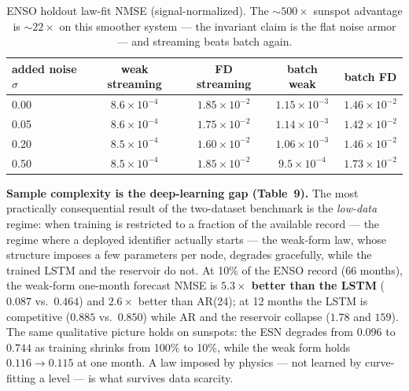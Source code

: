 \documentclass[10pt]{article}
\begin{document}
\begin{table}[h]
\centering\footnotesize
\caption{ENSO holdout law-fit NMSE (signal-normalized). The ${\sim}500\times$
sunspot advantage is ${\sim}22\times$ on this smoother system --- the invariant
claim is the flat noise armor --- and streaming beats batch again.}
\begin{tabular}{lcccc}
\toprule
added noise $\sigma$ & weak streaming & FD streaming & batch weak & batch FD \\
\midrule
0.00 & $8.6{\times}10^{-4}$ & $1.85{\times}10^{-2}$ & $1.15{\times}10^{-3}$ & $1.46{\times}10^{-2}$ \\
0.05 & $8.6{\times}10^{-4}$ & $1.75{\times}10^{-2}$ & $1.14{\times}10^{-3}$ & $1.42{\times}10^{-2}$ \\
0.20 & $8.5{\times}10^{-4}$ & $1.60{\times}10^{-2}$ & $1.06{\times}10^{-3}$ & $1.46{\times}10^{-2}$ \\
0.50 & $8.5{\times}10^{-4}$ & $1.85{\times}10^{-2}$ & $9.5{\times}10^{-4}$ & $1.73{\times}10^{-2}$ \\
\bottomrule
\end{tabular}
\end{table}

\textbf{Sample complexity is the deep-learning gap (Table~9).} The most
practically consequential result of the two-dataset benchmark is the
\emph{low-data} regime: when training is restricted to a fraction of the
available record --- the regime where a deployed identifier actually starts ---
the weak-form law, whose structure imposes a few parameters per node, degrades
gracefully, while the trained LSTM and the reservoir do not. At 10\% of the
ENSO record (66 months), the weak-form one-month forecast NMSE is
\textbf{$5.3\times$ better than the LSTM} ($0.087$ vs.\ $0.464$) and
$2.6\times$ better than AR(24); at 12 months the LSTM is competitive
($0.885$ vs.\ $0.850$) while AR and the reservoir collapse ($1.78$ and
$159$). The same qualitative picture holds on sunspots: the ESN degrades from
$0.096$ to $0.744$ as training shrinks from 100\% to 10\%, while the weak form
holds $0.116 \to 0.115$ at one month. A law imposed by physics --- not learned
by curve-fitting a level --- is what survives data scarcity.
\end{document}
